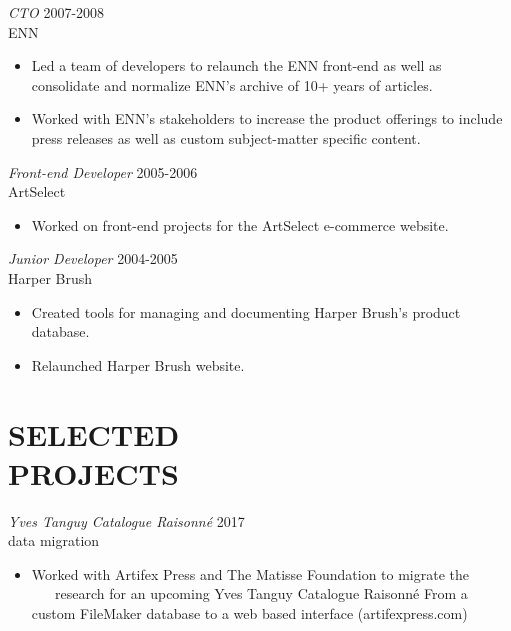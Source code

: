 \documentclass[line,margin]{res}
\begin{document}
\begin{resume}
\begin{samepage}
\begin{itemize}
    \end{itemize}
    \end{samepage}

    {\sl CTO}
    \hfill 2007-2008 \\
    ENN
    \begin{itemize} \itemsep -2pt
        \item
            Led a team of developers to relaunch the ENN front-end as well as
            consolidate and normalize ENN's archive of 10+ years of articles.

        \item
            Worked with ENN's stakeholders to increase the product offerings
            to include press releases as well as custom subject-matter
            specific content.

    \end{itemize}

    {\sl Front-end Developer}
    \hfill 2005-2006 \\
    ArtSelect
    \begin{itemize} \itemsep -2pt
        \item
            Worked on front-end projects for the ArtSelect e-commerce website.

    \end{itemize}

    {\sl Junior Developer}
    \hfill 2004-2005 \\
    Harper Brush
    \begin{itemize} \itemsep -2pt
        \item
            Created tools for managing and documenting Harper Brush's product
            database.

        \item
            Relaunched Harper Brush website.
    \end{itemize}

\section{SELECTED \\ PROJECTS}
    {\sl Yves Tanguy Catalogue Raisonné}
    \hfill 2017 \\
    data migration
    \begin{itemize} \itemsep -2pt
        \item
            Worked with Artifex Press and The Matisse Foundation to migrate the
            research for an upcoming Yves Tanguy Catalogue Raisonné From a
            custom FileMaker database to a web based interface (artifexpress.com)
    \end{itemize}


\end{resume}
\end{document}
